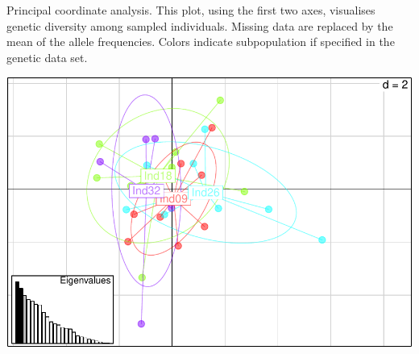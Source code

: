 \documentclass[a4paper]{scrartcl}\usepackage[]{graphicx}\usepackage[]{color}
\makeatletter
\def\maxwidth{ %
  \ifdim\Gin@nat@width>\linewidth
    \linewidth
  \else
    \Gin@nat@width
  \fi
}
\newenvironment{knitrout}{}{} %
\makeatother
\begin{document}
Principal coordinate analysis. This plot, using the first two axes, visualises genetic diversity among sampled individuals. Missing data are replaced by the mean of the allele frequencies.
Colors indicate subpopulation if specified in the genetic data set.


\begin{knitrout}
\color{fgcolor}
\includegraphics[width=\maxwidth]{PopGenReport-pcoa-1} 

\end{knitrout}

\FloatBarrier
\end{document}
